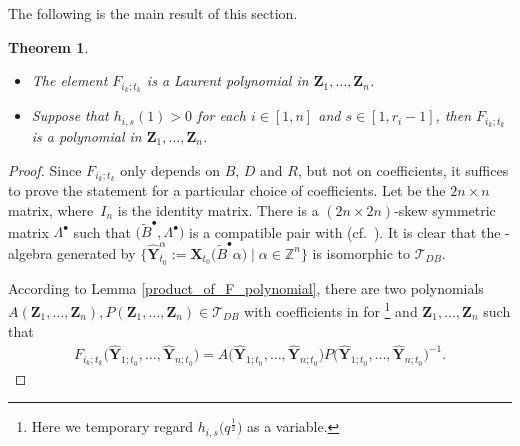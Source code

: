\documentclass[pdftex]{sigma}
\numberwithin{equation}{section}
\newtheorem{Theorem}{Theorem}[section]
\begin{document}
The following is the main result of this section.
\begin{Theorem}\label{t:F-polynomial}\qquad
\begin{itemize}\itemsep=0pt
 \item[$(1)$] The element $F_{i_k;t_k}$ is a Laurent polynomial in $\mathbf{Z}_1,\dots, \mathbf{Z}_n$.
 \item[$(2)$] Suppose that $h_{i,s}(1)>0$ for each $i\in [1,n]$ and $s\in [1,r_i-1]$, then $F_{i_k;t_k}$ is a polynomial in $\mathbf{Z}_1,\dots, \mathbf{Z}_n$.
\end{itemize}

\end{Theorem}
\begin{proof}
 Since $F_{i_k;t_k}$ only depends on $B$, $D$ and $R$, but not on coefficients, it suffices to prove the statement for a particular choice of coefficients. Let  be the $2n\times n$ matrix, where~$I_n$ is the identity matrix. There is a $(2n\times 2n)$-skew symmetric matrix $\Lambda^{\bullet}$ such that $\bigl(\tilde{B}^{\bullet},\Lambda^{\bullet}\bigr)$ is a compatible pair with  (cf.\ \cite[Example 0.5]{Berenstein_Zelevinsky2005}). It is clear that the -algebra generated by $\bigl\{\mathbf{\hat{Y}}_{t_0}^{\alpha}:=\mathbf{X}_{t_{0}}\bigl(\tilde{B}^{\bullet}\alpha\bigr)\mid \alpha\in\mathbb{Z}^{n}\bigr\}$ is isomorphic to $\mathcal{T}_{DB}$.

 According to Lemma \ref{product_of_F_polynomial}, there are two polynomials $A(\mathbf{Z}_{1},\dots,\mathbf{Z}_{n}),P(\mathbf{Z}_{1},\dots,\mathbf{Z}_{n})\in \mathcal{T}_{DB}$ with coefficients in  for \footnote{Here we temporary regard $h_{i,s}\bigl(q^{\frac{1}{2}}\bigr)$ as a variable.} and $\mathbf{Z}_{1},\dots,\mathbf{Z}_{n}$ such that
 \begin{align}\label{fraction_of_F-polynomial}
 F_{i_{k};t_{k}}\bigl(\mathbf{\hat{Y}}_{1;t_{0}},\dots,\mathbf{\hat{Y}}_{n;t_{0}}\bigr)=A\bigl(\mathbf{\hat{Y}}_{1;t_{0}},\dots,\mathbf{\hat{Y}}_{n;t_{0}}\bigr)P\bigl(\mathbf{\hat{Y}}_{1;t_{0}},\dots,\mathbf{\hat{Y}}_{n;t_{0}}\bigr)^{-1}.
 \end{align}



\end{proof}
\end{document}
